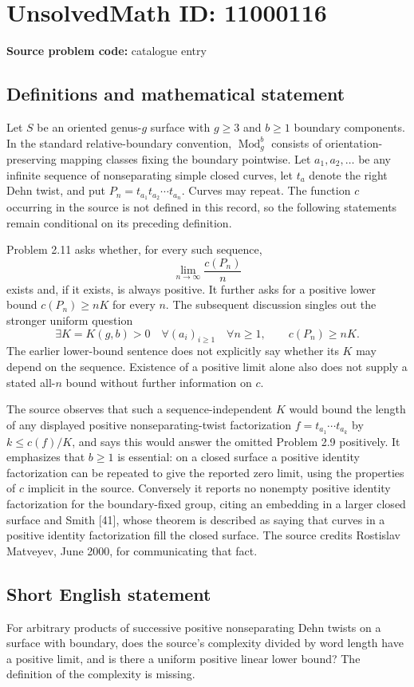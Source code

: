 \documentclass[11pt]{article}
\begin{document}
\section*{UnsolvedMath ID: 11000116}
\textbf{Source problem code:} catalogue entry
\subsection{Definitions and mathematical statement}
Let $S$ be an oriented genus-$g$ surface with $g\geq3$ and $b\geq1$ boundary components. In the standard relative-boundary convention, $\operatorname{Mod}_g^b$ consists of orientation-preserving mapping classes fixing the boundary pointwise. Let $a_1,a_2,\ldots$ be any infinite sequence of nonseparating simple closed curves, let $t_a$ denote the right Dehn twist, and put $P_n=t_{a_1}t_{a_2}\cdots t_{a_n}$. Curves may repeat. The function $c$ occurring in the source is not defined in this record, so the following statements remain conditional on its preceding definition.

Problem 2.11 asks whether, for every such sequence,
\[
 \lim_{n\to\infty}\frac{c(P_n)}n
\]
exists and, if it exists, is always positive. It further asks for a positive lower bound $c(P_n)\geq nK$ for every $n$. The subsequent discussion singles out the stronger uniform question
\[
 \exists K=K(g,b)>0\quad\forall(a_i)_{i\geq1}\quad
 \forall n\geq1,\qquad c(P_n)\geq nK.
\]
The earlier lower-bound sentence does not explicitly say whether its $K$ may depend on the sequence. Existence of a positive limit alone also does not supply a stated all-$n$ bound without further information on $c$.

The source observes that such a sequence-independent $K$ would bound the length of any displayed positive nonseparating-twist factorization $f=t_{a_1}\cdots t_{a_k}$ by $k\leq c(f)/K$, and says this would answer the omitted Problem 2.9 positively. It emphasizes that $b\geq1$ is essential: on a closed surface a positive identity factorization can be repeated to give the reported zero limit, using the properties of $c$ implicit in the source. Conversely it reports no nonempty positive identity factorization for the boundary-fixed group, citing an embedding in a larger closed surface and Smith [41], whose theorem is described as saying that curves in a positive identity factorization fill the closed surface. The source credits Rostislav Matveyev, June 2000, for communicating that fact.
\subsection{Short English statement}
For arbitrary products of successive positive nonseparating Dehn twists on a surface with boundary, does the source's complexity divided by word length have a positive limit, and is there a uniform positive linear lower bound? The definition of the complexity is missing.
\end{document}
